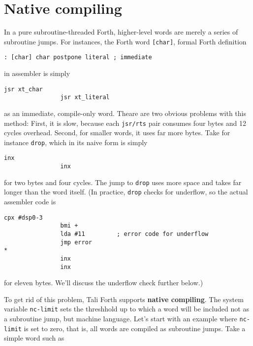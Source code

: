 

\section{Native compiling}

In a pure subroutine-threaded Forth, higher-level words are merely a series of
subroutine jumps. For instances, the Forth word \texttt{[char]}, formal Forth
definition

\begin{lstlisting}[frame=single]
: [char] char postpone literal ; immediate
\end{lstlisting}

in assembler is simply

\begin{lstlisting}[frame=single]
                jsr xt_char
                jsr xt_literal
\end{lstlisting}

as an immediate, compile-only word. Theare are two obvious problems with this
method: First, it is slow, because each \texttt{jsr/rts} pair consumes four
bytes and 12 cycles overhead. Second, for smaller words, it uses far more bytes.
Take for instance \texttt{drop}, which in its naive form is simply

\begin{lstlisting}[frame=single]
                inx
                inx
\end{lstlisting}

for two bytes and four cycles. The jump to \texttt{drop} uses more space and
takes far longer than the word itself. (In practice, \texttt{drop} checks for
underflow, so the actual assembler code is

\begin{lstlisting}[frame=single]
                cpx #dsp0-3
                bmi +
                lda #11         ; error code for underflow
                jmp error
*
                inx
                inx
\end{lstlisting}

for eleven bytes. We'll discuss the underflow check further below.)

To get rid of this problem, Tali Forth supports \textbf{native compiling}. The
system variable \texttt{nc-limit} sets the threshhold up to which a word will be
included not as a subroutine jump, but machine language. Let's start with an
example where \texttt{nc-limit} is set to zero, that is, all words are compiled
as subroutine jumps.  Take a simple word such as

